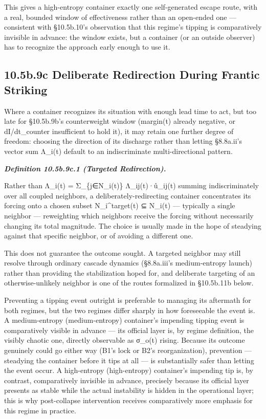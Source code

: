 \documentclass[
]{article}
\begin{document}
This gives a high-entropy container exactly one self-generated escape
route, with a real, bounded window of effectiveness rather than an
open-ended one --- consistent with §10.5b.10's observation that this
regime's tipping is comparatively invisible in advance: the window
exists, but a container (or an outside observer) has to recognize the
approach early enough to use it.

\hypertarget{b.9c-deliberate-redirection-during-frantic-striking}{%
\subsection{10.5b.9c Deliberate Redirection During Frantic
Striking}\label{b.9c-deliberate-redirection-during-frantic-striking}}

Where a container recognizes its situation with enough lead time to act,
but too late for §10.5b.9b's counterweight window (margin(t) already
negative, or dI/dt\_counter insufficient to hold it), it may retain one
further degree of freedom: choosing the direction of its discharge
rather than letting §8.8a.ii's vector sum ⃗Λ\_i(t) default to an
indiscriminate multi-directional pattern.

\emph{\textbf{Definition 10.5b.9c.1 (Targeted Redirection).}}

Rather than ⃗Λ\_i(t) = Σ\_\{j∈N\_i(t)\} Λ\_ij(t)·û\_ij(t) summing
indiscriminately over all coupled neighbors, a deliberately-redirecting
container concentrates its forcing onto a chosen subset
N\_i\^{}target(t) ⊆ N\_i(t) --- typically a single neighbor ---
reweighting which neighbors receive the forcing without necessarily
changing its total magnitude. The choice is usually made in the hope of
steadying against that specific neighbor, or of avoiding a different
one.

This does not guarantee the outcome sought. A targeted neighbor may
still resolve through ordinary cascade dynamics (§8.8a.iii's
medium-entropy launch) rather than providing the stabilization hoped
for, and deliberate targeting of an otherwise-unlikely neighbor is one
of the routes formalized in §10.5b.11b below.

Preventing a tipping event outright is preferable to managing its
aftermath for both regimes, but the two regimes differ sharply in how
foreseeable the event is. A medium-entropy (medium-entropy) container's
impending tipping event is comparatively visible in advance --- its
official layer is, by regime definition, the visibly chaotic one,
directly observable as σ\_o(t) rising. Because its outcome genuinely
could go either way (B1's lock or B2's reorganization), prevention ---
steadying the container before it tips at all --- is substantially safer
than letting the event occur. A high-entropy (high-entropy) container's
impending tip is, by contrast, comparatively invisible in advance,
precisely because its official layer presents as stable while the actual
instability is hidden in the operational layer; this is why
post-collapse intervention receives comparatively more emphasis for this
regime in practice.
\end{document}
